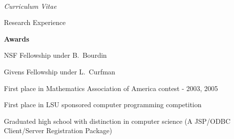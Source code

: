 \documentclass[10pt]{article}
\newenvironment{subbulletlist}{%
	\begin{list}{\labelitemii}{%
		\setlength{\topsep}{\itemsep}\setlength{\parskip}{\parsep}%
	}%
}%
{ \end{list} }
\begin{document}
\begin{cv}{\name\\{\large \itshape Curriculum Vitae}}
\begin{cvlist}{Research Experience}
	\item \textbf{Awards}
	\begin{subbulletlist}
		\item NSF Fellowship under B.~Bourdin
		\item Givens Fellowship under L.~Curfman
		\item First place in Mathematics Association of America contest - 2003, 2005
		\item First place in LSU sponsored computer programming competition
		\item Graduated high school with distinction in computer science (A JSP/ODBC Client/Server Registration Package)

\end{subbulletlist}
\end{cvlist}
\end{cv}
\end{document}
